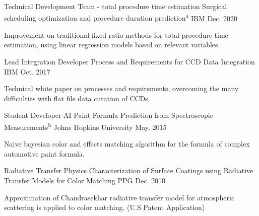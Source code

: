 

\begin{cventries}

  \cventry
    {Technical Development Team - total procedure time estimation} %
    {Surgical scheduling optimization and procedure duration prediction\textsuperscript{a}} %
    {IBM} %
    {Dec. 2020} %
    {
      \begin{cvcompactparagraph}
        Improvement on traditional fixed ratio methods for total procedure time estimation, using linear regression models based on relevant variables.
      \end{cvcompactparagraph}
    }

  \cventry
    {Lead Integration Developer} %
    {Process and Requirements for CCD Data Integration} %
    {IBM} %
    {Oct. 2017} %
    {
      \begin{cvcompactparagraph}
        Technical white paper on processes and requirements, overcoming the many difficulties with flat file data curation of CCDs.
      \end{cvcompactparagraph}
    }

  \cventry
    {Student Developer} %
    {AI Paint Formula Prediction from Spectroscopic Measurements\textsuperscript{b}} %
    {Johns Hopkins University} %
    {May. 2015} %
    {
      \begin{cvcompactparagraph}
        Naive bayesian color and effects matching algorithm for the formula of complex automotive paint formula.
      \end{cvcompactparagraph}
    }

  \cventry
    {Radiative Transfer Physics} %
    {Characterization of Surface Coatings using Radiative Transfer Models for Color Matching} %
    {PPG} %
    {Dec. 2010} %
    {
      \begin{cvcompactparagraph}
        Approximation of Chandrasekhar radiative transfer model for atmospheric scattering is applied to color matching.  (U.S Patent Application)
      \end{cvcompactparagraph}
    }


\end{cventries}
